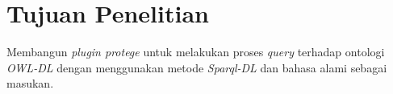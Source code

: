 \section{Tujuan Penelitian}
Membangun \emph{plugin protege} untuk melakukan proses \emph{query} terhadap ontologi \emph{OWL-DL} dengan menggunakan metode \emph{Sparql-DL} dan bahasa alami sebagai masukan.